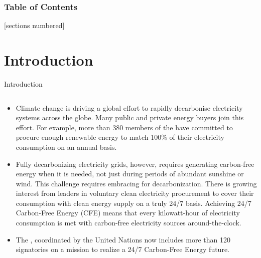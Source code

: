 \begin{frame}
  \frametitle{Table of Contents}
  [sections numbered]
  \tableofcontents[hideallsubsections]
\end{frame}



\section{Introduction}


\begin{frame}{Introduction}

  {\footnotesize
  \centering
  \begin{columns}[T]
  \begin{column}{9cm}
    \begin{itemize}
    \item Climate change is driving a global effort to \alert{rapidly decarbonise} 
    electricity systems across the globe. Many public and private energy buyers join this effort. For example, more than 380 members of the  have committed to procure enough renewable energy to match 100\% of their electricity consumption on an annual basis.

    \item Fully decarbonizing electricity grids, however, requires generating carbon-free energy when it is needed, not just during periods of abundant sunshine or wind. This challenge requires embracing  for decarbonization. 
    There is growing interest from leaders in voluntary clean  electricity procurement to cover their consumption with clean energy supply on a \alert{truly 24/7 basis}.  Achieving 24/7 Carbon-Free Energy (CFE) means that every kilowatt-hour of electricity consumption is met
    with carbon-free electricity sources \alert{around-the-clock}.

    \item The , coordinated by the United Nations now includes more than 120 signatories on a mission to realize a 24/7 Carbon-Free Energy future. 

    \end{itemize}
    \end{column}


\end{columns}}
\end{frame}
